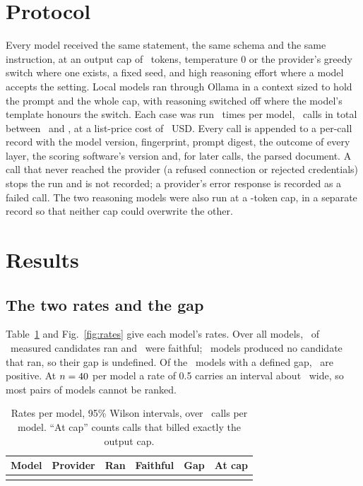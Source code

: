 \documentclass[journal]{IEEEtran}
\begin{document}
\section{Protocol}\label{sec:protocol}

Every model received the same statement, the same schema and the same instruction, at an output cap
of \protocolCap\ tokens, temperature 0 or the provider's greedy switch where one exists, a fixed
seed, and high reasoning effort where a model accepts the setting. Local models ran through Ollama
in a context sized to hold the prompt and the whole cap, with reasoning switched off where the
model's template honours the switch. Each case was run \nRepeats\ times per model, \nCalls\ calls in
total between \measuredFrom\ and \measuredTo, at a list-price cost of \costUSD\ USD. Every call is
appended to a per-call record with the model version, fingerprint, prompt digest, the outcome of
every layer, the scoring software's version and, for later calls, the parsed document. A call that
never reached the provider (a refused connection or rejected credentials) stops the run and is not
recorded; a provider's error response is recorded as a failed call. The two reasoning models were
also run at a \capHigh-token cap, in a separate record so that neither cap could overwrite the other.

\section{Results}\label{sec:results}

\subsection{The two rates and the gap}

Table~\ref{tab:models} and Fig.~\ref{fig:rates} give each model's rates. Over all models,
\nRanAll\ of \nMeasuredAll\ measured candidates ran and \nFaithfulAll\ were faithful; \nNothingRan\
models produced no candidate that ran, so their gap is undefined. Of the \nGapDefined\ models with a
defined gap, \nGapPositive\ are positive. At $n = 40$ per model a rate of 0.5 carries an
interval about \wilsonWidth\ wide, so most pairs of models cannot be ranked.

\begin{table}[t]
\centering
\caption{Rates per model, 95\% Wilson intervals, over \nPerModel\ calls per model.
``At cap'' counts calls that billed exactly the output cap.}
\label{tab:models}
\begin{tabular}{llcccc}
\toprule
Model & Provider & Ran & Faithful & Gap & At cap \\
\midrule
\tablebody{table-models.tex}
\bottomrule
\end{tabular}
\end{table}
\end{document}
